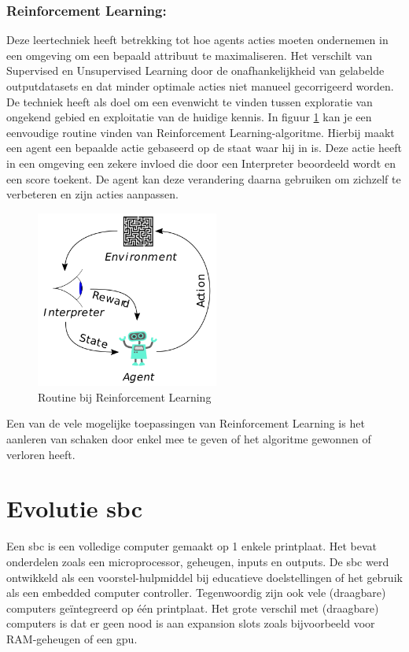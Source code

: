 	\subsubsection{Reinforcement Learning:} Deze leertechniek heeft betrekking tot hoe agents acties moeten ondernemen in een omgeving om een bepaald attribuut te maximaliseren. Het verschilt van Supervised en Unsupervised Learning door de onafhankelijkheid van gelabelde outputdatasets en dat minder optimale acties niet manueel gecorrigeerd worden. De techniek heeft als doel om een evenwicht te vinden tussen exploratie van ongekend gebied en exploitatie van de huidige kennis. In figuur \ref{fig:reinforcemntLearning} kan je een eenvoudige routine vinden van Reinforcement Learning-algoritme. Hierbij maakt een agent een bepaalde actie gebaseerd op de staat waar hij in is. Deze actie heeft in een omgeving een zekere invloed die door een Interpreter beoordeeld wordt en een score toekent. De agent kan deze verandering daarna gebruiken om zichzelf te verbeteren en zijn acties aanpassen. 
	\begin{figure}
		\centering
		\includegraphics[width=60mm]{afbeeldingen/Reinforcement_learning_diagram.PNG}
		\caption{Routine bij Reinforcement Learning}
		\label{fig:reinforcemntLearning}
	\end{figure}
	Een van de vele mogelijke toepassingen van Reinforcement Learning is het aanleren van schaken door enkel mee te geven of het algoritme gewonnen of verloren heeft. 
	

\newpage	

\section{Evolutie \gls{sbc}}
Een \gls{sbc} is een volledige computer gemaakt op 1 enkele printplaat. Het bevat onderdelen zoals een microprocessor, geheugen, inputs en outputs. De \gls{sbc} werd ontwikkeld als een voorstel-hulpmiddel bij educatieve doelstellingen of het gebruik als een embedded computer controller. Tegenwoordig zijn ook vele (draagbare) computers ge\"integreerd op \'e\'en printplaat. Het grote verschil met (draagbare) computers is dat er geen nood is aan expansion slots zoals bijvoorbeeld voor RAM-geheugen of een \gls{gpu}.
